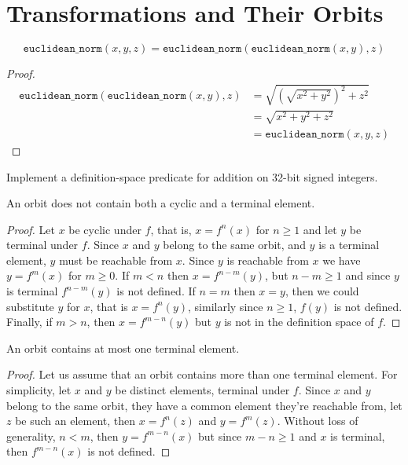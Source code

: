 
\chapter{Transformations and Their Orbits}

\begin{lemma}
	\[ \mathtt{euclidean\_norm}(x, y, z) = \mathtt{euclidean\_norm}(\mathtt{euclidean\_norm}(x, y), z) \]
\end{lemma}

\begin{proof}
	\begin{align*}
		\mathtt{euclidean\_norm}(\mathtt{euclidean\_norm}(x, y), z)
		&= \sqrt{\left (\sqrt{x^2 + y^2} \right )^2 + z^2}\\
		&= \sqrt{x^2 + y^2 + z^2}\\
		&= \mathtt{euclidean\_norm}(x, y, z)
	\end{align*}
\end{proof}

\begin{exercise}
	Implement a definition-space predicate for addition on 32-bit signed integers.
\end{exercise}



\begin{lemma}
	An orbit does not contain both a cyclic and a terminal element.
\end{lemma}

\begin{proof}
	Let $x$ be cyclic under $f$, that is, $x = f^n(x)$ for $n \geq 1$ and let $y$ be
	terminal under $f$. Since $x$ and $y$ belong to the same orbit, and $y$ is a
	terminal element, $y$ must be reachable from $x$. Since $y$ is reachable from $x$
	we have $y = f^m(x)$ for $m \geq 0$. If $m < n$ then $x = f^{n - m}(y)$, but
	$n - m \geq 1$ and since $y$ is terminal $f^{n - m}(y)$ is not defined. If $n = m$
	then $x = y$, then we could substitute $y$ for $x$, that is $x = f^n(y)$, similarly
	since $n \geq 1$, $f(y)$ is not defined. Finally, if $m > n$, then $x = f^{m - n}(y)$
	but $y$ is not in the definition space of $f$.
\end{proof}

\begin{lemma}
	An orbit contains at most one terminal element.
\end{lemma}

\begin{proof}
	Let us assume that an orbit contains more than one terminal element. For simplicity,
	let $x$ and $y$ be distinct elements, terminal under $f$. Since $x$ and $y$ belong
	to the same orbit, they have a common element they're reachable from, let $z$ be
	such an element, then $x = f^n(z)$ and $y = f^m(z)$. Without loss of generality,
	$n < m$, then $y = f^{m - n}(x)$ but since $m - n \geq 1$ and $x$ is terminal, then
	$f^{m - n}(x)$ is not defined.
\end{proof}

